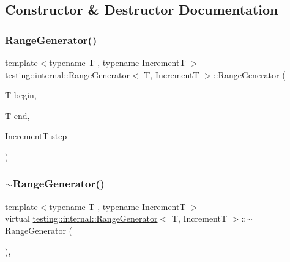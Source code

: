 \subsection{Constructor \& Destructor Documentation}
\mbox{\label{classtesting_1_1internal_1_1RangeGenerator_a5b3b83223b9cada3569bcee729e0fdf3}} 
\subsubsection{\texorpdfstring{RangeGenerator()}{RangeGenerator()}}
{\footnotesize\ttfamily template$<$typename T , typename IncrementT $>$ \\
\mbox{\hyperlink{classtesting_1_1internal_1_1RangeGenerator}{testing\+::internal\+::\+Range\+Generator}}$<$ T, IncrementT $>$\+::\mbox{\hyperlink{classtesting_1_1internal_1_1RangeGenerator}{Range\+Generator}} (\begin{DoxyParamCaption}\item[{T}]{begin,  }\item[{T}]{end,  }\item[{IncrementT}]{step }\end{DoxyParamCaption})\hspace{0.3cm}{\ttfamily [inline]}}

\mbox{\label{classtesting_1_1internal_1_1RangeGenerator_a680b80b06f471b5f93d8433609017021}} 
\subsubsection{\texorpdfstring{$\sim$RangeGenerator()}{~RangeGenerator()}}
{\footnotesize\ttfamily template$<$typename T , typename IncrementT $>$ \\
virtual \mbox{\hyperlink{classtesting_1_1internal_1_1RangeGenerator}{testing\+::internal\+::\+Range\+Generator}}$<$ T, IncrementT $>$\+::$\sim$\mbox{\hyperlink{classtesting_1_1internal_1_1RangeGenerator}{Range\+Generator}} (\begin{DoxyParamCaption}{ }\end{DoxyParamCaption})\hspace{0.3cm}{\ttfamily [inline]}, {\ttfamily [virtual]}}



